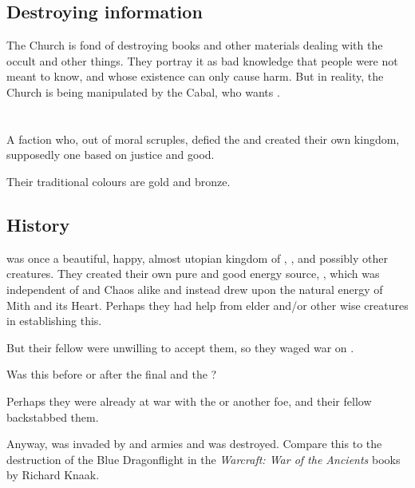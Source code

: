 \subsection{Destroying information}
The Church is fond of destroying books and other materials dealing with the occult and other  things. They portray it as bad knowledge that people were not meant to know, and whose existence can only cause harm. But in reality, the Church is being manipulated by the Cabal, who wants .















\section{\Kezerad}
\label{Kezerad}
\label{Kezeradi}
A \resphan{} faction who, out of moral scruples, defied the \banes{} and created their own kingdom, supposedly one based on justice and good. 

Their traditional colours are gold and bronze. 







\subsection{History}
\Kezerad{} was once a beautiful, happy, almost utopian kingdom of \resphain, \humans, \nephilim{} and possibly other creatures. They created their own pure and good energy source, \iquin, which was independent of \Erebos{} and Chaos alike and instead drew upon the natural energy of Mith and its Heart. Perhaps they had help from elder \ophidians{} and/or other wise creatures in establishing this. 

\label{Fall of Kezerad}
But their fellow \resphain{} were unwilling to accept them, so they waged war on \Kezerad. 

Was this before or after the final  and the \hyperref[Cuezcan Apocalypse]{\CuezcanApocalypse}?

Perhaps they were already at war with the \Baelzerach{} or another foe, and their fellow \resphain{} backstabbed them.

Anyway, \Kezerad{} was invaded by \resphan{} and \bane{} armies and was destroyed. Compare this to the destruction of the Blue Dragonflight in the \emph{Warcraft: War of the Ancients} books by Richard Knaak. 

